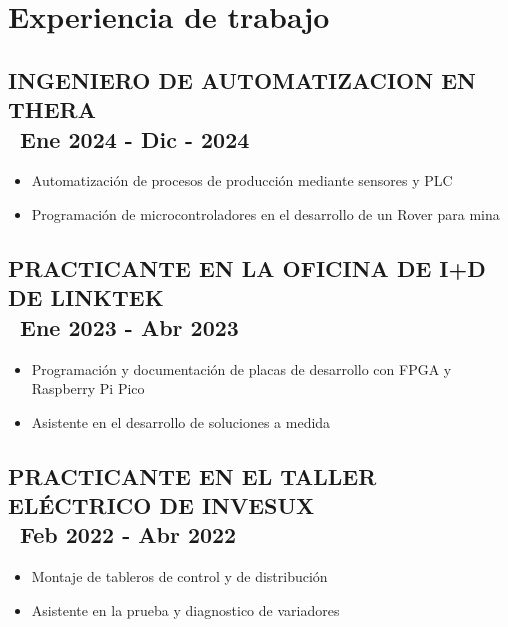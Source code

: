 \documentclass[12pt]{article}
\begin{document}
  \begin{minipage}[t]{0.6\textwidth}

    \section{Experiencia de trabajo}
      
      \subsection{INGENIERO DE AUTOMATIZACION EN THERA\\
      \textbar\ Ene 2024 - Dic - 2024}
        
        \begin{itemize}
          \item Automatización de procesos de producción mediante sensores y PLC
          \item Programación de microcontroladores en el desarrollo de un Rover para mina
        \end{itemize}


      \subsection{PRACTICANTE EN LA OFICINA DE I+D DE LINKTEK\\
      \textbar\ Ene 2023 - Abr 2023}

        \begin{itemize}
          \item  Programación y documentación de placas de desarrollo con FPGA y Raspberry Pi Pico
          \item Asistente en el desarrollo de soluciones a medida
        \end{itemize}

      \subsection{PRACTICANTE EN EL TALLER ELÉCTRICO DE INVESUX\\
      \textbar\ Feb 2022 - Abr 2022}

        \begin{itemize}
          \item Montaje de tableros de control y de distribución
          \item Asistente en la prueba y diagnostico de variadores
        \end{itemize}


\end{minipage}
\end{document}
